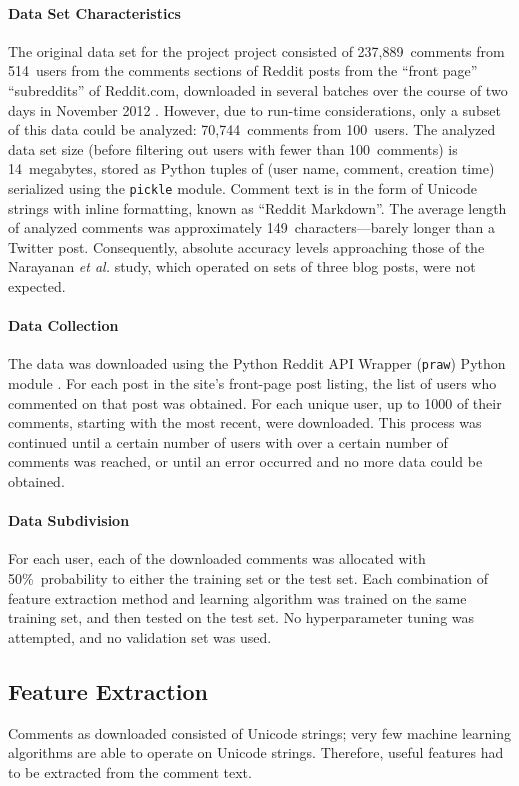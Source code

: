 \documentclass{article}
\begin{document}
\paragraph{Data Set Characteristics}
The original data set for the project project consisted of 237,889~comments from 514~users from the comments sections of Reddit posts from the ``front page'' ``subreddits'' of Reddit.com, downloaded in several batches over the course of two days in November 2012 \cite{reddit2012reddit}. However, due to run-time considerations, only a subset of this data could be analyzed: 70,744~comments from 100~users. The analyzed data set size (before filtering out users with fewer than 100~comments) is 14~megabytes, stored as Python tuples of (user name, comment, creation time) serialized using the \texttt{pickle} module. Comment text is in the form of Unicode strings with inline formatting, known as ``Reddit Markdown''. The average length of analyzed comments was  approximately 149~characters---barely longer than a Twitter post. Consequently, absolute accuracy levels approaching those of the Narayanan \textit{et al.} study, which operated on sets of three blog posts, were not expected.

\paragraph{Data Collection}
The data was downloaded using the Python Reddit API Wrapper (\texttt{praw}) Python module \cite{boe2012python}. For each post in the site's front-page post listing, the list of users who commented on that post was obtained. For each unique user, up to 1000 of their comments, starting with the most recent, were downloaded. This process was continued until a certain number of users with over a certain number of comments was reached, or until an error occurred and no more data could be obtained.

\paragraph{Data Subdivision}
For each user, each of the downloaded comments was allocated with 50\%~probability to either the training set or the test set. Each combination of feature extraction method and learning algorithm was trained on the same training set, and then tested on the test set. No hyperparameter tuning was attempted, and no validation set was used.

\subsection{Feature Extraction}
Comments as downloaded consisted of Unicode strings; very few machine learning algorithms are able to operate on Unicode strings. Therefore, useful features had to be extracted from the comment text.
\end{document}
